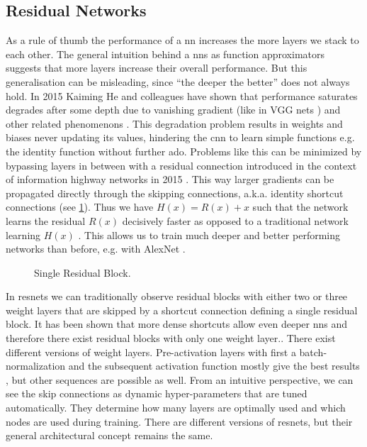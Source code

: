 \subsection{Residual Networks}

As a rule of thumb the performance of a \acrshort{nn} increases the more layers we stack to each other. The general intuition behind a \acrshort{nn}s as function approximators suggests that more layers increase their overall performance. But this generalisation can be misleading, since “the deeper the better” does not always hold. In 2015 Kaiming He and colleagues have shown that performance saturates degrades after some depth due to vanishing gradient (like in VGG nets \cite{Simonyan.942014}) and other related phenomenons \cite{He.12102015}. This degradation problem results in weights and biases never updating its values, hindering the \acrshort{cnn} to learn simple functions e.g. the identity function without further ado. Problems like this can be minimized by bypassing layers in between with a residual connection introduced in the context of information highway networks in 2015 \cite{Srivastava.7222015}. This way larger gradients can be propagated directly through the skipping connections, a.k.a. identity shortcut connections (see \cref{fig:resblock}). Thus we have \( H(x) = R(x) + x \) such that the network learns the residual \( R(x) \) decisively faster as opposed to a traditional network learning \( H(x) \) \cite{He.12102015}. This allows us to train much deeper and better performing networks than before, e.g. with AlexNet \cite{Krizhevsky.2017}.
\begin{figure}[hbt]
    \centering
    
    \caption[Single residual block]{Single Residual Block. \cite{He.12102015}\cite{Riebesell.2022}}
    \label{fig:resblock}
\end{figure}

In \acrshort{resnet}s we can traditionally observe residual blocks with either two or three weight layers that are skipped by a shortcut connection defining a single residual block. It has been shown that more dense shortcuts allow even deeper \acrshort{nn}s and therefore there exist residual blocks with only one weight layer.\cite{Huang.8252016}. There exist different versions of weight layers. Pre-activation layers with first a \gls{batch-normalization} and the subsequent activation function mostly give the best results \cite{He.3162016}, but other sequences are possible as well. From an intuitive perspective, we can see the skip connections as dynamic hyper-parameters that are tuned automatically. They determine how many layers are optimally used and which nodes are used during training. There are different versions of \acrshort{resnet}s, but their general architectural concept remains the same. 

